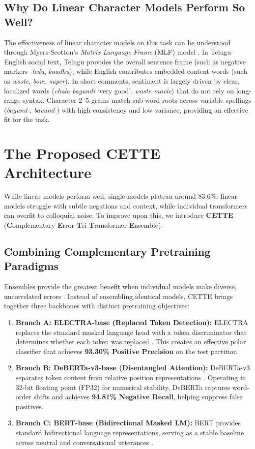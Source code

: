 \documentclass[10pt,conference]{IEEEtran}
\begin{document}
\subsection{Why Do Linear Character Models Perform So Well?}
The effectiveness of linear character models on this task can be understood through Myers-Scotton's \emph{Matrix Language Frame} (MLF) model \cite{myersscotton2002}. In Telugu--English social text, Telugu provides the overall sentence frame (such as negative markers \textit{-ledu}, \textit{kaadhu}), while English contributes embedded content words (such as \textit{waste}, \textit{bore}, \textit{super}). In short comments, sentiment is largely driven by clear, localized words (\textit{chala bagundi} `very good', \textit{waste movie}) that do not rely on long-range syntax. Character 2--5-grams match sub-word roots across variable spellings (\textit{bagund-}, \textit{bavund-}) with high consistency and low variance, providing an effective fit for the task.

\section{The Proposed CETTE Architecture}
While linear models perform well, single models plateau around 83.6\%: linear models struggle with subtle negations and context, while individual transformers can overfit to colloquial noise. To improve upon this, we introduce \textbf{CETTE} (\textbf{C}omplementary-\textbf{E}rror \textbf{T}ri-\textbf{T}ransformer \textbf{E}nsemble).

\subsection{Combining Complementary Pretraining Paradigms}
Ensembles provide the greatest benefit when individual models make diverse, uncorrelated errors \cite{dietterich1998}. Instead of ensembling identical models, CETTE brings together three backbones with distinct pretraining objectives:
\begin{enumerate}
    \item \textbf{Branch A: ELECTRA-base (Replaced Token Detection):} ELECTRA replaces the standard masked language head with a token discriminator that determines whether each token was replaced \cite{clark2020}. This creates an effective polar classifier that achieves \textbf{93.30\% Positive Precision} on the test partition.
    \item \textbf{Branch B: DeBERTa-v3-base (Disentangled Attention):} DeBERTa-v3 separates token content from relative position representations \cite{he2021}. Operating in 32-bit floating point (FP32) for numerical stability, DeBERTa captures word-order shifts and achieves \textbf{94.81\% Negative Recall}, helping suppress false positives.
    \item \textbf{Branch C: BERT-base (Bidirectional Masked LM):} BERT provides standard bidirectional language representations, serving as a stable baseline across neutral and conversational utterances \cite{devlin2019}.
\end{enumerate}
\end{document}

